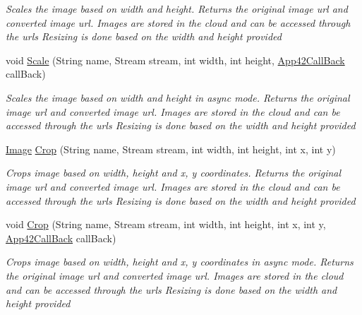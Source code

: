 \begin{DoxyCompactItemize}
\begin{DoxyCompactList}\small\item\em Scales the image based on width and height. Returns the original image url and converted image url. Images are stored in the cloud and can be accessed through the urls Resizing is done based on the width and height provided \end{DoxyCompactList}\item 
void \hyperlink{classcom_1_1shephertz_1_1app42_1_1paas_1_1sdk_1_1csharp_1_1image_processor_1_1_image_processor_service_a297492787334fb79a61508ae50e0ea79}{Scale} (String name, Stream stream, int width, int height, \hyperlink{interfacecom_1_1shephertz_1_1app42_1_1paas_1_1sdk_1_1csharp_1_1_app42_call_back}{App42\+Call\+Back} call\+Back)
\begin{DoxyCompactList}\small\item\em Scales the image based on width and height in async mode. Returns the original image url and converted image url. Images are stored in the cloud and can be accessed through the urls Resizing is done based on the width and height provided \end{DoxyCompactList}\item 
\hyperlink{classcom_1_1shephertz_1_1app42_1_1paas_1_1sdk_1_1csharp_1_1image_processor_1_1_image}{Image} \hyperlink{classcom_1_1shephertz_1_1app42_1_1paas_1_1sdk_1_1csharp_1_1image_processor_1_1_image_processor_service_aab2595f6a047ca3b94397cc85ab1a219}{Crop} (String name, Stream stream, int width, int height, int x, int y)
\begin{DoxyCompactList}\small\item\em Crops image based on width, height and x, y coordinates. Returns the original image url and converted image url. Images are stored in the cloud and can be accessed through the urls Resizing is done based on the width and height provided \end{DoxyCompactList}\item 
void \hyperlink{classcom_1_1shephertz_1_1app42_1_1paas_1_1sdk_1_1csharp_1_1image_processor_1_1_image_processor_service_a3406fcd91fc804a3d9b056047ddf7888}{Crop} (String name, Stream stream, int width, int height, int x, int y, \hyperlink{interfacecom_1_1shephertz_1_1app42_1_1paas_1_1sdk_1_1csharp_1_1_app42_call_back}{App42\+Call\+Back} call\+Back)
\begin{DoxyCompactList}\small\item\em Crops image based on width, height and x, y coordinates in async mode. Returns the original image url and converted image url. Images are stored in the cloud and can be accessed through the urls Resizing is done based on the width and height provided \end{DoxyCompactList}\item 

\end{DoxyCompactItemize}
